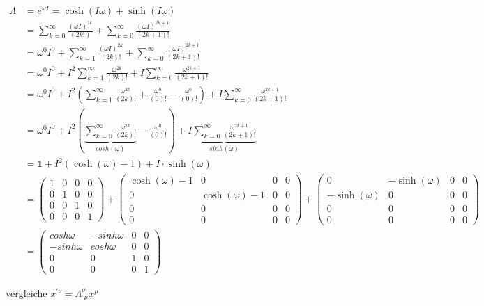 \begin{align}
\Lambda &= e^{\omega I} = \cosh(I\omega) + \sinh(I\omega) \\
&=\sum^{\infty}_{k=0}\frac{(\omega I)^{2k}}{(2k!)}+\sum^{\infty}_{k=0}\frac{(\omega I)^{2k+1}}{(2k+1)!} \\
&=\omega^0 I^0 + \sum^{\infty}_{k=1}\frac{(\omega I)^{2k}}{(2k)!}+\sum^{\infty}_{k=0}\frac{(\omega I)^{2k+1}}{(2k+1)!} \\
&=\omega^0 I^0 + I^2\sum^{\infty}_{k=1}\frac{\omega^{2k}}{(2k)!}+ I\sum^{\infty}_{k=0}\frac{\omega^{2k+1}}{(2k+1)!} \\
&=\omega^0 I^0 + I^2\left(\sum^{\infty}_{k=1}\frac{\omega^{2k}}{(2k)!}+\frac{\omega^0}{(0)!}- \frac{\omega^0}{(0)!}\right)+I\sum^{\infty}_{k=0}\frac{\omega^{2k+1}}{(2k+1)!} \\
&=\omega^0 I^0 + I^2\left(\underbrace{\sum^{\infty}_{k=0}\frac{\omega^{2k}}{(2k)!}}_{cosh(\omega)}-\frac{\omega^0}{(0)!}\right)+I\underbrace{\sum^{\infty}_{k=0}\frac{\omega^{2k+1}}{(2k+1)!}}_{sinh(\omega)} \\
&=\mathbb 1 + I^2\left(\cosh(\omega)-1\right)+I\cdot \sinh(\omega) \\
&=\begin{pmatrix} 1&0&0&0\\ 0&1&0&0 \\ 0&0&1&0\\ 0&0&0&1 \end{pmatrix} + \begin{pmatrix} \cosh(\omega)-1&0&0&0\\ 0&\cosh(\omega)-1&0&0 \\ 0&0&0&0\\ 0&0&0&0 \end{pmatrix} +\begin{pmatrix} 0&-\sinh(\omega)&0&0\\ -\sinh(\omega)&0&0&0 \\ 0&0&0&0\\ 0&0&0&0 \end{pmatrix} \\
&=  \begin{pmatrix} cosh\omega&-sinh\omega&0&0\\ -sinh\omega&cosh\omega&0&0 \\ 0&0&1&0\\ 0&0&0&1 \end{pmatrix} 
\end{align}

vergleiche \(x^{'\nu} = \Lambda^\nu_{\,\,\mu}x^\mu\)


